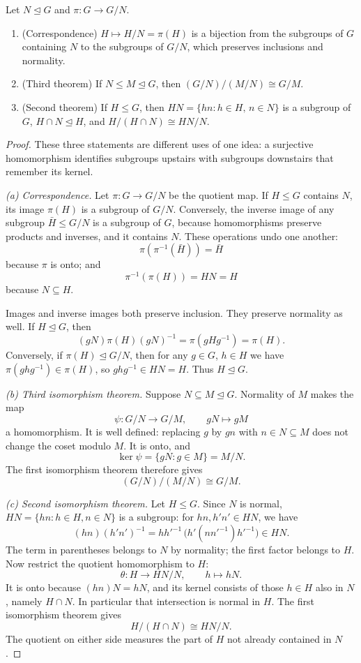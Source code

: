 \begin{theorem}\label{thm:iso23}
Let $N\trianglelefteq G$ and $\pi:G\to G/N$.
\begin{enumerate}[label=(\alph*)]
\item (Correspondence) $H\mapsto H/N=\pi(H)$ is a bijection from the subgroups of $G$ containing $N$ to the subgroups of $G/N$, which preserves inclusions and normality.
\item (Third theorem) If $N\le M\trianglelefteq G$, then $(G/N)/(M/N)\cong G/M$.
\item (Second theorem) If $H\le G$, then $HN=\{hn:h\in H,\,n\in N\}$ is a subgroup of $G$, $H\cap N\trianglelefteq H$, and $H/(H\cap N)\cong HN/N$.
\end{enumerate}
\end{theorem}
\begin{proof}
These three statements are different uses of one idea:
a surjective homomorphism identifies subgroups upstairs
with subgroups downstairs that remember its kernel.

\emph{(a) Correspondence.}
Let $\pi:G\to G/N$ be the quotient map.
If $H\le G$ contains $N$, its image $\pi(H)$
is a subgroup of $G/N$. Conversely, the inverse
image of any subgroup $\bar H\le G/N$ is a
subgroup of $G$, because homomorphisms preserve
products and inverses, and it contains $N$.
These operations undo one another:
\[
\pi(\pi^{-1}(\bar H))=\bar H
\]
because $\pi$ is onto; and
\[
\pi^{-1}(\pi(H))=HN=H
\]
because $N\subseteq H$.

Images and inverse images both preserve inclusion.
They preserve normality as well. If $H\trianglelefteq G$,
then
\[
(gN)\pi(H)(gN)^{-1}=\pi(gHg^{-1})=\pi(H).
\]
Conversely, if $\pi(H)\trianglelefteq G/N$,
then for any $g\in G$, $h\in H$ we have
$\pi(ghg^{-1})\in\pi(H)$, so
$ghg^{-1}\in HN=H$. Thus $H\trianglelefteq G$.

\emph{(b) Third isomorphism theorem.}
Suppose $N\subseteq M\trianglelefteq G$.
Normality of $M$ makes the map
\[
\psi:G/N\longrightarrow G/M,\qquad
gN\longmapsto gM
\]
a homomorphism. It is well defined: replacing
$g$ by $gn$ with $n\in N\subseteq M$
does not change the coset modulo $M$.
It is onto, and
\[
\ker\psi=\{gN:g\in M\}=M/N.
\]
The first isomorphism theorem therefore gives
\[
\boxed{(G/N)/(M/N)\cong G/M}.
\]

\emph{(c) Second isomorphism theorem.}
Let $H\le G$. Since $N$ is normal,
$HN=\{hn:h\in H,n\in N\}$ is a subgroup:
for $hn,h'n'\in HN$, we have
\[
(hn)(h'n')^{-1}
=hh'^{-1}\,\bigl(h'(nn'^{-1})h'^{-1}\bigr)\in HN.
\]
The term in parentheses belongs to $N$
by normality; the first factor belongs to $H$.
Now restrict the quotient homomorphism to $H$:
\[
\theta:H\to HN/N,\qquad h\mapsto hN.
\]
It is onto because $(hn)N=hN$, and its
kernel consists of those $h\in H$ also in $N$,
namely $H\cap N$. In particular that
intersection is normal in $H$.
The first isomorphism theorem gives
\[
\boxed{H/(H\cap N)\cong HN/N}.
\]
The quotient on either side measures the part
of $H$ not already contained in $N$.
\end{proof}

